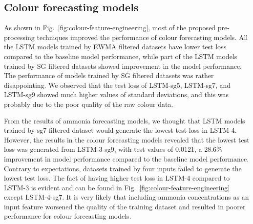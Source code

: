 \subsection{Colour forecasting models}

As shown in Fig.~\ref{fig:colour-feature-engineering}, most of the proposed pre-processing techniques improved the performance of colour forecasting models. All the LSTM models trained by EWMA filtered datasets have lower test loss compared to the baseline model performance, while part of the LSTM models trained by SG filtered datasets showed improvement in the model performance. The performance of models trained by SG filtered datasets was rather disappointing. We observed that the test loss of LSTM-sg5, LSTM-sg7, and LSTM-sg9 showed much higher values of standard deviations, and this was probably due to the poor quality of the raw colour data. 

From the results of ammonia forecasting models, we thought that LSTM models trained by sg7 filtered dataset would generate the lowest test loss in LSTM-4. However, the results in the colour forecasting models revealed that the lowest test loss was generated from LSTM-3-sg9, with test values of 0.0121, a 28.6\% improvement in model performance compared to the baseline model performance. Contrary to expectations, datasets trained by four inputs failed to generate the lowest test loss. The fact of having higher test loss in LSTM-4 compared to LSTM-3 is evident and can be found in Fig.~\ref{fig:colour-feature-engineering} except LSTM-4-sg7. It is very likely that including ammonia concentrations as an input feature worsened the quality of the training dataset and resulted in poorer performance for colour forecasting models.




